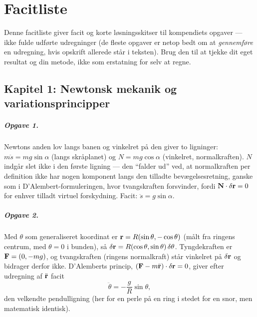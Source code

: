 
\chapter*{Facitliste}

Denne facitliste giver facit og korte løsningsskitser til
kompendiets opgaver — ikke fulde udførte udregninger (de fleste
opgaver er netop bedt om at \emph{gennemføre} en udregning, hvis
opskrift allerede står i teksten). Brug den til at tjekke dit eget
resultat og din metode, ikke som erstatning for selv at regne.

\section*{Kapitel 1: Newtonsk mekanik og variationsprincipper}

\paragraph{Opgave 1.} Newtons anden lov langs banen og vinkelret på
den giver to ligninger: $m\ddot s = mg\sin\alpha$ (langs skråplanet)
og $N=mg\cos\alpha$ (vinkelret, normalkraften). $N$ indgår slet ikke
i den første ligning — den ``falder ud'' ved, at normalkraften per
definition ikke har nogen komponent langs den tilladte
bevægelsesretning, ganske som i D'Alembert-formuleringen, hvor
tvangskraften forsvinder, fordi $\vb{N}\cdot\delta\vb{r}=0$ for enhver
tilladt virtuel forskydning. Facit: $\ddot s=g\sin\alpha$.

\paragraph{Opgave 2.} Med $\theta$ som generaliseret koordinat er
$\vb{r}=R(\sin\theta,-\cos\theta)$ (målt fra ringens centrum, med
$\theta=0$ i bunden), så $\delta\vb{r}=R(\cos\theta,\sin\theta)\,\delta\theta$.
Tyngdekraften er $\vb{F}=(0,-mg)$, og tvangskraften (ringens
normalkraft) står vinkelret på $\delta\vb{r}$ og bidrager derfor ikke.
D'Alemberts princip, $(\vb{F}-m\ddot{\vb{r}})\cdot\delta\vb{r}=0$, giver
efter udregning af $\ddot{\vb{r}}$ facit
\begin{equation*}
  \ddot\theta = -\frac{g}{R}\sin\theta,
\end{equation*}
den velkendte pendulligning (her for en perle på en ring i stedet for
en snor, men matematisk identisk).

